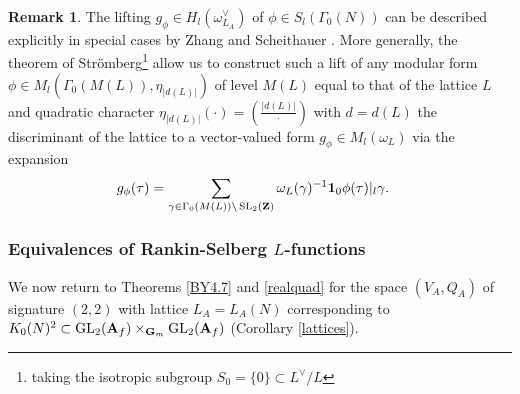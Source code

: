 \documentclass{amsart}
\theoremstyle{definition}
\theoremstyle{definition}
\theoremstyle{definition}
\newtheorem{remark}[theorem]{Remark}
\begin{document}
\begin{remark} The lifting  $g_{\phi} \in H_{l}(\omega_{L_A}^{\vee})$ of $\phi \in S_l( \Gamma_0(N) )$ can be described explicitly 
in special cases by Zhang \cite[Theorem 4.15]{YZ} and Scheithauer \cite[Theorem 3.1]{Scheit}. 
More generally, the theorem of Str\"omberg\footnote{taking the isotropic subgroup $S_0 = \lbrace 0 \rbrace \subset L^{\vee}/L$} \cite[Theorems 5.2 and 5.4]{Str}
allow us to construct such a lift of any modular form $\phi \in M_l(\Gamma_0(M(L)), \eta_{\vert d(L) \vert })$ of level $M(L)$ equal to that of the lattice
$L$ and quadratic character $\eta_{\vert d(L) \vert }(\cdot) = ( \frac{\vert d(L) \vert}{\cdot} )$ with $d = d(L)$ the discriminant of the lattice
to a vector-valued form $g_{\phi} \in M_l(\omega_L)$ via the expansion 
\begin{align*} g_{\phi}(\tau) &= \sum\limits_{\gamma \in \Gamma_0(M(L)) \backslash \operatorname{SL}_2({\bf{Z}})}
\omega_L(\gamma)^{-1} {\bf{1}}_0 \phi(\tau) \vert_l \gamma. \end{align*}\end{remark}

\subsubsection{Equivalences of Rankin-Selberg $L$-functions}

We now return to Theorems \ref{BY4.7} and \ref{realquad} for the space $(V_A, Q_A)$ of signature $(2,2)$ with lattice 
$L_A = L_A(N)$ corresponding to $K_0(N)^2 \subset  \operatorname{GL}_2({\bf{A}}_f) \times_{{\bf{G}}_m} \operatorname{GL}_2({\bf{A}}_f)$ (Corollary \ref{lattices}).
\end{document}
